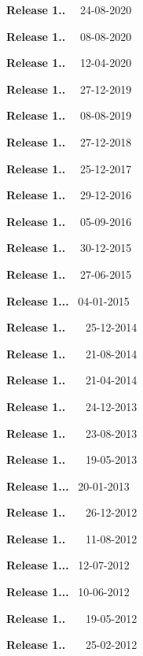 \begin{DoxyItemize}
\item {\bfseries{Release 1..}}~~ 24-\/08-\/2020 
\item {\bfseries{Release 1..}}~~ 08-\/08-\/2020 
\item {\bfseries{Release 1..}}~~ 12-\/04-\/2020 
\item {\bfseries{Release 1..}}~~ 27-\/12-\/2019 
\item {\bfseries{Release 1..}}~~ 08-\/08-\/2019 
\item {\bfseries{Release 1..}}~~ 27-\/12-\/2018 
\item {\bfseries{Release 1..}}~~ 25-\/12-\/2017 
\item {\bfseries{Release 1..}}~~ 29-\/12-\/2016 
\item {\bfseries{Release 1..}}~~ 05-\/09-\/2016 
\item {\bfseries{Release 1..}}~~ 30-\/12-\/2015 
\item {\bfseries{Release 1..}}~~ 27-\/06-\/2015 
\item {\bfseries{Release 1...}}~ 04-\/01-\/2015 
\item {\bfseries{Release 1..}}~~~ 25-\/12-\/2014 
\item {\bfseries{Release 1..}}~~~ 21-\/08-\/2014 
\item {\bfseries{Release 1..}}~~~ 21-\/04-\/2014 
\item {\bfseries{Release 1..}}~~~ 24-\/12-\/2013 
\item {\bfseries{Release 1..}}~~~ 23-\/08-\/2013 
\item {\bfseries{Release 1..}}~~~ 19-\/05-\/2013 
\item {\bfseries{Release 1...}}~ 20-\/01-\/2013 
\item {\bfseries{Release 1..}}~~~ 26-\/12-\/2012 
\item {\bfseries{Release 1..}}~~~ 11-\/08-\/2012 
\item {\bfseries{Release 1...}}~ 12-\/07-\/2012 
\item {\bfseries{Release 1...}}~ 10-\/06-\/2012 
\item {\bfseries{Release 1..}}~~~ 19-\/05-\/2012 
\item {\bfseries{Release 1..}}~~~ 25-\/02-\/2012 
\item {}
 

\end{DoxyItemize}
